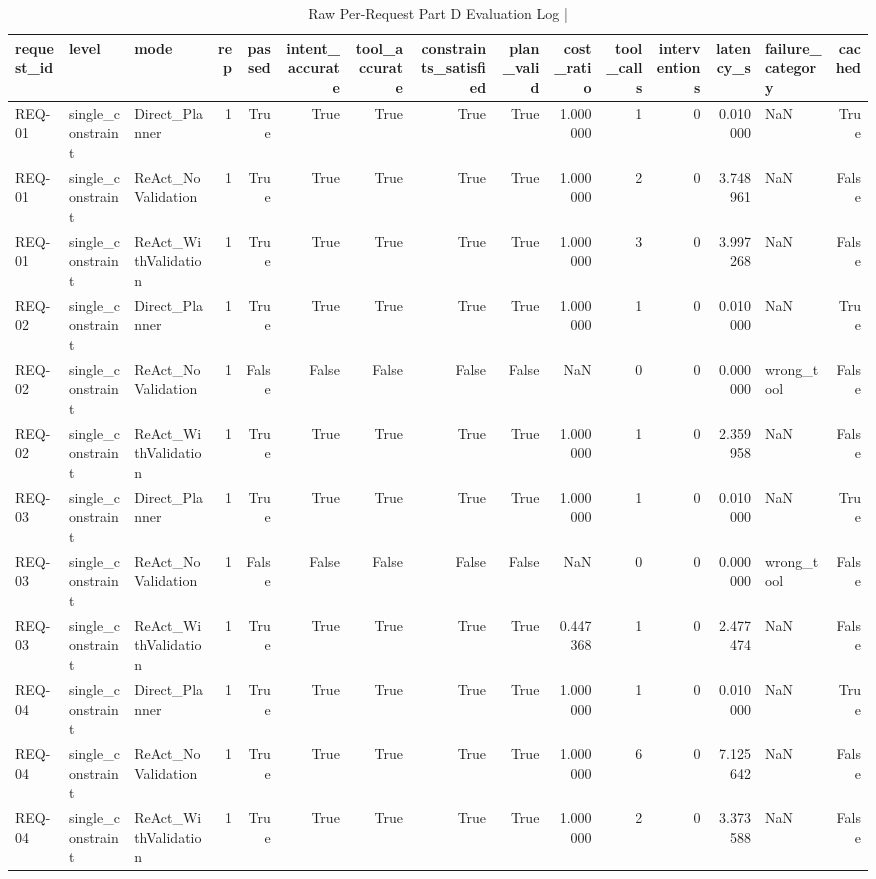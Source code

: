 \begin{table}[htbp]
\centering
\caption{Raw Per-Request Part D Evaluation Log | \stampline}
\label{tab:partD_llm_raw}
\begin{tabular}{lllrrrrrrrrrrlr}
\toprule
request\_id & level & mode & rep & passed & intent\_accurate & tool\_accurate & constraints\_satisfied & plan\_valid & cost\_ratio & tool\_calls & interventions & latency\_s & failure\_category & cached \\
\midrule
REQ-01 & single\_constraint & Direct\_Planner & 1 & True & True & True & True & True & 1.000000 & 1 & 0 & 0.010000 & NaN & True \\
REQ-01 & single\_constraint & ReAct\_NoValidation & 1 & True & True & True & True & True & 1.000000 & 2 & 0 & 3.748961 & NaN & False \\
REQ-01 & single\_constraint & ReAct\_WithValidation & 1 & True & True & True & True & True & 1.000000 & 3 & 0 & 3.997268 & NaN & False \\
REQ-02 & single\_constraint & Direct\_Planner & 1 & True & True & True & True & True & 1.000000 & 1 & 0 & 0.010000 & NaN & True \\
REQ-02 & single\_constraint & ReAct\_NoValidation & 1 & False & False & False & False & False & NaN & 0 & 0 & 0.000000 & wrong\_tool & False \\
REQ-02 & single\_constraint & ReAct\_WithValidation & 1 & True & True & True & True & True & 1.000000 & 1 & 0 & 2.359958 & NaN & False \\
REQ-03 & single\_constraint & Direct\_Planner & 1 & True & True & True & True & True & 1.000000 & 1 & 0 & 0.010000 & NaN & True \\
REQ-03 & single\_constraint & ReAct\_NoValidation & 1 & False & False & False & False & False & NaN & 0 & 0 & 0.000000 & wrong\_tool & False \\
REQ-03 & single\_constraint & ReAct\_WithValidation & 1 & True & True & True & True & True & 0.447368 & 1 & 0 & 2.477474 & NaN & False \\
REQ-04 & single\_constraint & Direct\_Planner & 1 & True & True & True & True & True & 1.000000 & 1 & 0 & 0.010000 & NaN & True \\
REQ-04 & single\_constraint & ReAct\_NoValidation & 1 & True & True & True & True & True & 1.000000 & 6 & 0 & 7.125642 & NaN & False \\
REQ-04 & single\_constraint & ReAct\_WithValidation & 1 & True & True & True & True & True & 1.000000 & 2 & 0 & 3.373588 & NaN & False \\

\end{tabular}
\end{table}

